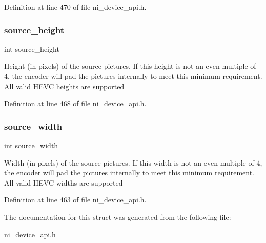 Definition at line 470 of file ni\+\_\+device\+\_\+api.\+h.

\mbox{\label{struct__ni__encoder__params_a972c93682a2377d2a7b396ab0d89c349}} 
\subsubsection{\texorpdfstring{source\_height}{source\_height}}
{\footnotesize\ttfamily int source\+\_\+height}

Height (in pixels) of the source pictures. If this height is not an even multiple of 4, the encoder will pad the pictures internally to meet this minimum requirement. All valid H\+E\+VC heights are supported 

Definition at line 468 of file ni\+\_\+device\+\_\+api.\+h.

\mbox{\label{struct__ni__encoder__params_a4ace2d09726597a7e529c3ba7be2983a}} 
\subsubsection{\texorpdfstring{source\_width}{source\_width}}
{\footnotesize\ttfamily int source\+\_\+width}

Width (in pixels) of the source pictures. If this width is not an even multiple of 4, the encoder will pad the pictures internally to meet this minimum requirement. All valid H\+E\+VC widths are supported 

Definition at line 463 of file ni\+\_\+device\+\_\+api.\+h.



The documentation for this struct was generated from the following file\+:\begin{DoxyCompactItemize}
\item 
\mbox{\hyperlink{ni__device__api_8h}{ni\+\_\+device\+\_\+api.\+h}}\end{DoxyCompactItemize}
